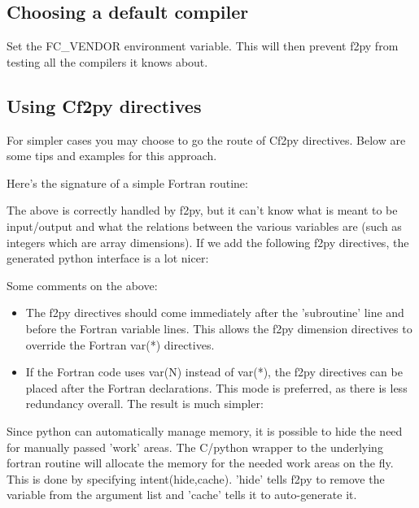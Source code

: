 \subsection{Choosing a default compiler }

Set the FC\_VENDOR environment variable. This will then prevent f2py
from testing all the compilers it knows about. 


\subsection{Using Cf2py directives }

For simpler cases you may choose to go the route of Cf2py directives.
Below are some tips and examples for this approach.

Here's the signature of a simple Fortran routine: 

The above is correctly handled by f2py, but it can't know what is
meant to be input/output and what the relations between the various
variables are (such as integers which are array dimensions). If we
add the following f2py directives, the generated python interface
is a lot nicer: 



Some comments on the above:

\begin{itemize}
\item The f2py directives should come immediately after the 'subroutine'
line and before the Fortran variable lines. This allows the f2py dimension
directives to override the Fortran var({*}) directives.
\item If the Fortran code uses var(N) instead of var({*}), the f2py directives
can be placed after the Fortran declarations. This mode is preferred,
as there is less redundancy overall. The result is much simpler: 
\end{itemize}




Since python can automatically manage memory, it is possible to hide
the need for manually passed 'work' areas. The C/python wrapper to
the underlying fortran routine will allocate the memory for the needed
work areas on the fly. This is done by specifying intent(hide,cache).
'hide' tells f2py to remove the variable from the argument list and
'cache' tells it to auto-generate it.

